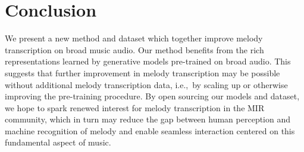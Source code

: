 \section{Conclusion}

We present a new method and dataset which together improve melody transcription on broad music audio. 
Our method benefits from the rich representations learned by generative models pre-trained on broad audio. 
This suggests that further improvement in melody transcription may be possible without additional melody transcription data, i.e.,~by scaling up or otherwise improving the pre-training procedure. 
By open sourcing our models and dataset, 
we hope to spark renewed interest for melody transcription in the MIR community, 
which in turn may reduce the gap between human perception and machine recognition of melody and enable seamless interaction centered on this fundamental aspect of music.


